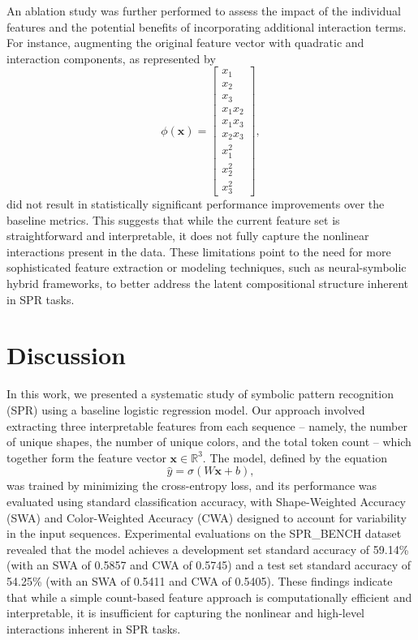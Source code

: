\documentclass{article}
\begin{document}
\noindent An ablation study was further performed to assess the impact of the individual features and the potential benefits of incorporating additional interaction terms. For instance, augmenting the original feature vector with quadratic and interaction components, as represented by 
\[
\phi(\mathbf{x}) = \begin{bmatrix} x_1 \\ x_2 \\ x_3 \\ x_1x_2 \\ x_1x_3 \\ x_2x_3 \\ x_1^2 \\ x_2^2 \\ x_3^2 \end{bmatrix},
\]
did not result in statistically significant performance improvements over the baseline metrics. This suggests that while the current feature set is straightforward and interpretable, it does not fully capture the nonlinear interactions present in the data. These limitations point to the need for more sophisticated feature extraction or modeling techniques, such as neural-symbolic hybrid frameworks, to better address the latent compositional structure inherent in SPR tasks.

\section{Discussion}
In this work, we presented a systematic study of symbolic pattern recognition (SPR) using a baseline logistic regression model. Our approach involved extracting three interpretable features from each sequence – namely, the number of unique shapes, the number of unique colors, and the total token count – which together form the feature vector \(\mathbf{x} \in \mathbb{R}^3\). The model, defined by the equation 
\[
\hat{y} = \sigma(W\mathbf{x} + b),
\]
was trained by minimizing the cross-entropy loss, and its performance was evaluated using standard classification accuracy, with Shape-Weighted Accuracy (SWA) and Color-Weighted Accuracy (CWA) designed to account for variability in the input sequences. Experimental evaluations on the SPR\_BENCH dataset revealed that the model achieves a development set standard accuracy of 59.14\% (with an SWA of 0.5857 and CWA of 0.5745) and a test set standard accuracy of 54.25\% (with an SWA of 0.5411 and CWA of 0.5405). These findings indicate that while a simple count-based feature approach is computationally efficient and interpretable, it is insufficient for capturing the nonlinear and high-level interactions inherent in SPR tasks.
\end{document}
